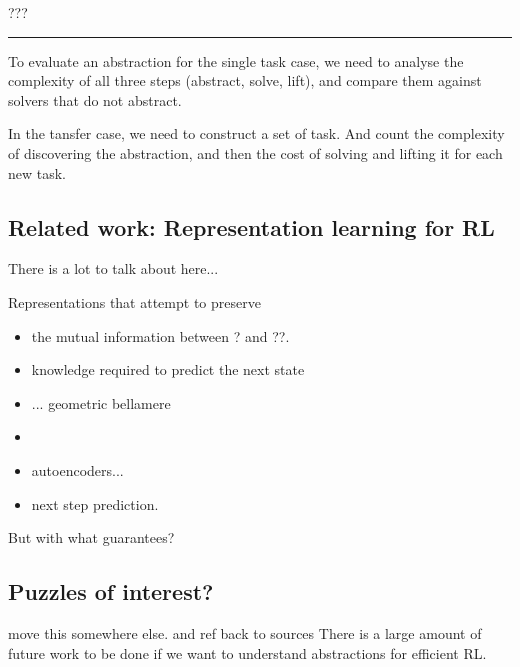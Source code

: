 ???

\begin{center}\rule{0.5\linewidth}{\linethickness}\end{center}

To evaluate an abstraction for the single task case, we need to analyse the
complexity of all three steps (abstract, solve, lift), and compare them against
solvers that do not abstract.

In the tansfer case, we need to construct a set of task. And count the
complexity of discovering the abstraction, and then the cost of solving
and lifting it for each new task.

\subsection{Related work: Representation learning for RL}


{\color{red}There is a lot to talk about here...}

Representations that attempt to preserve
\begin{itemize}
\tightlist
  \item the mutual information between ? and ??.
  \item knowledge required to predict the next state
  \item ... geometric bellamere
  \item \cite{Nachum2018}
  \item autoencoders...
  \item next step prediction.
\end{itemize}

But with what guarantees?

\subsection{Puzzles of interest?}

{\color{red}move this somewhere else. and ref back to sources}
There is a large amount of future work to be done if we want to understand abstractions for efficient RL.

